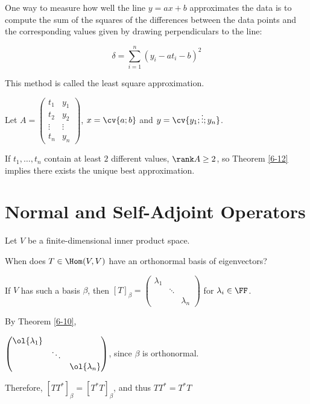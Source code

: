 \documentclass[11pt]{scrartcl}
\begin{document}
One way to measure how well the line $y = ax +b $ approximates the
data is to compute the sum of the squares of the differences between
the data points and the corresponding values given by drawing
perpendiculars to the line:


\begin{equation*}
\delta = \sum_{i=1}^n(y_i-at_i-b)^2
\end{equation*}

This method is called the least square approximation.

Let $A = 
\begin{pmatrix}
  t_1    & y_1    \\
  t_2    & y_2    \\
  \vdots & \vdots \\
  t_n    & y_n
\end{pmatrix} $, $x = \cv{a;b}$ and $y=\cv{y_1;\vdots;y_n}$.

If $t_1, \dots, t_n$ contain at least $2$ different values,
$\rank A \geq 2$, so Theorem \ref{6-12} implies there exists the unique best
approximation.

\section{Normal and Self-Adjoint Operators}

Let $V$ be a finite-dimensional inner  product space.

\begin{ques*}

  When does $T \in \Hom(V,V)$ have an orthonormal basis of eigenvectors?

\end{ques*}
\begin{answer*}
  If $V$ has such a basis $\beta$, then $[T]_{\beta} = 
  \begin{pmatrix}
    \lambda_1 &        & \\
              & \ddots & \\
              &        & \lambda_n
            \end{pmatrix}$ for $\lambda_i\in\FF$.

            By Theorem \ref{6-10},

            $  \begin{pmatrix}
    \ol{\lambda_1} &        & \\
              & \ddots & \\
              &        & \ol{\lambda_n}
            \end{pmatrix}$, since $\beta$ is orthonormal.


Therefore, $[TT^{*}]_{\beta} = [T^{*}T]_{\beta}$, and thus $TT^{*}=T^{*}T$            
\end{answer*}
\end{document}
